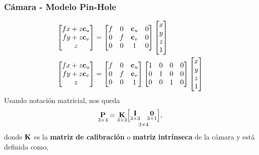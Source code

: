 \begin{frame}
    \frametitle{Cámara - Modelo Pin-Hole}   
    \footnotesize
    \begin{align*}
        \begin{bmatrix}
            fx+z\boldsymbol{\mathbf{c}}_{u}\\
            fy+z\boldsymbol{\mathbf{c}}_{v}\\
            z
        \end{bmatrix}
        &=
        \begin{bmatrix}
            f & 0 & \boldsymbol{\mathbf{c}}_{u} & 0\\
            0 & f & \boldsymbol{\mathbf{c}}_{v} & 0\\
            0 & 0 & 1 & 0
        \end{bmatrix}
        \begin{bmatrix}
            x\\
            y\\
            z\\
            1
        \end{bmatrix}\\
        \begin{bmatrix}
            fx+z\boldsymbol{\mathbf{c}}_{u}\\
            fy+z\boldsymbol{\mathbf{c}}_{v}\\
            z
        \end{bmatrix}
        &=
        \begin{bmatrix}f & 0 & \boldsymbol{\mathbf{c}}_{u}\\
            0 & f & \boldsymbol{\mathbf{c}}_{v}\\
            0 & 0 & 1
        \end{bmatrix}
        \begin{bmatrix}
            1 & 0 & 0 & 0\\
            0 & 1 & 0 & 0\\
            0 & 0 & 1 & 0
        \end{bmatrix}
        \begin{bmatrix}
            x\\
            y\\
            z\\
            1
        \end{bmatrix}
    \end{align*}
    Usando notación matricial, nos queda
    \begin{equation*}
        \underset{3 \times 4}{\boldsymbol{\mathbf{P}}}=\underset{3 \times 3}{\boldsymbol{\mathbf{K}}}\underset{3 \times 4}{\begin{bmatrix} \underset{3 \times 3}{\boldsymbol{\mathbf{I}}} & \underset{3 \times 1}{\boldsymbol{\mathbf{0}}}\end{bmatrix}},
    \end{equation*}
    donde $\boldsymbol{\mathbf{K}}$ es la \textbf{matriz de calibración} o \textbf{matriz intrínseca}  de la cámara y está definida como,
    

\end{frame}
